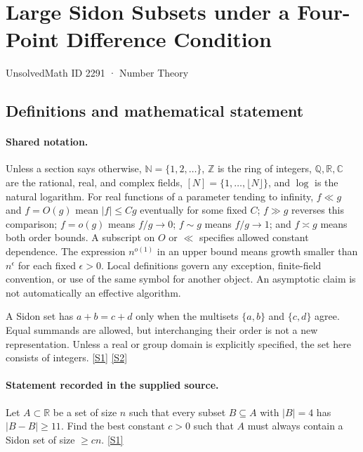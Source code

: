 \documentclass[11pt,a4paper]{article}
\newcommand{\N}{\mathbb{N}}
\newcommand{\Z}{\mathbb{Z}}
\newcommand{\Q}{\mathbb{Q}}
\newcommand{\R}{\mathbb{R}}
\newcommand{\C}{\mathbb{C}}
\newcommand{\sref}[2]{\hyperlink{source:#1:#2}{[S#2]}}
\begin{document}

\setcounter{section}{2290}

\section{Large Sidon Subsets under a Four-Point Difference Condition}\label{2291}

{\small\sffamily UnsolvedMath ID 2291 · Number Theory}

\subsection{Definitions and mathematical statement}

\paragraph{Shared notation.}Unless a section says otherwise, $\N=\{1,2,\ldots\}$,
$\Z$ is the ring of integers, $\Q,\R,\C$ are the rational, real, and complex
fields, $[N]=\{1,\ldots,\lfloor N\rfloor\}$, and $\log$ is the natural
logarithm. For real functions of a parameter tending to infinity,
$f\ll g$ and $f=O(g)$ mean $|f|\leq Cg$ eventually for some fixed $C$;
$f\gg g$ reverses this comparison; $f=o(g)$ means $f/g\to0$;
$f\sim g$ means $f/g\to1$; and $f\asymp g$ means both order bounds.
A subscript on $O$ or $\ll$ specifies allowed constant dependence.
The expression $n^{o(1)}$ in an upper bound means growth smaller than
$n^\epsilon$ for each fixed $\epsilon>0$. Local definitions govern any
exception, finite-field convention, or use of the same symbol for another
object. An asymptotic claim is not automatically an effective algorithm.



A Sidon set has $a+b=c+d$ only when the multisets $\{a,b\}$ and $\{c,d\}$ agree. Equal summands are allowed, but interchanging their order is not a new representation. Unless a real or group domain is explicitly specified, the set here consists of integers. \sref{2291}{1} \sref{2291}{2}

\paragraph{Statement recorded in the supplied source.}
Let $A\subset \mathbb{R}$ be a set of size $n$ such that every subset $B\subseteq A$ with $\lvert B\rvert =4$ has $\lvert B-B\rvert\geq 11$. Find the best constant $c>0$ such that $A$ must always contain a Sidon set of size $\geq cn$. \sref{2291}{1}
\end{document}
